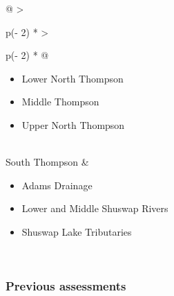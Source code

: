 \documentclass[11pt]{book}
\begin{document}
\begin{longtable}[]{@{}
  >{\raggedright\arraybackslash}p{(\columnwidth - 2\tabcolsep) * }
  >{\raggedright\arraybackslash}p{(\columnwidth - 2\tabcolsep) * }@{}}
\begin{minipage}[t]{\linewidth}
\begin{itemize}
\item
  Lower North Thompson
\item
  Middle Thompson
\item
  Upper North Thompson
\end{itemize}
\end{minipage} \\
South Thompson & \begin{minipage}[t]{\linewidth}\raggedright
\begin{itemize}

\item
  Adams Drainage
\item
  Lower and Middle Shuswap Rivers
\item
  Shuswap Lake Tributaries
\end{itemize}
\end{minipage} \\
\bottomrule
\end{longtable}
\hypertarget{previous-assessments}{%
\subsubsection{Previous assessments}\label{previous-assessments}}
\end{document}
